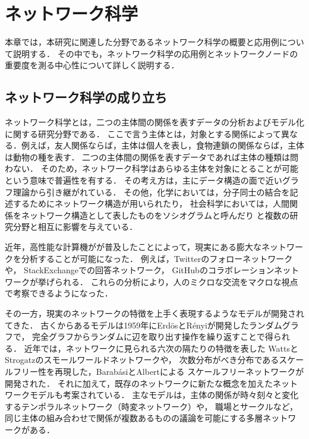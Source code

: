 \chapter{ネットワーク科学}
\label{chap:network-science}

本章では，本研究に関連した分野であるネットワーク科学の概要と応用例について説明する．
その中でも，ネットワーク科学の応用例とネットワークノードの重要度を測る中心性について詳しく説明する．

\section{ネットワーク科学の成り立ち}

ネットワーク科学とは，二つの主体間の関係を表すデータの分析およびモデル化に関する研究分野である．
ここで言う主体とは，対象とする関係によって異なる．例えば，友人関係ならば，主体は個人を表し，食物連鎖の関係ならば，主体は動物の種を表す．
二つの主体間の関係を表すデータであれば主体の種類は問わない．
そのため，ネットワーク科学はあらゆる主体を対象にとることが可能という意味で普遍性を有する．
その考え方は，主にデータ構造の面で近いグラフ理論から引き継がれている．
その他，化学においては，分子同士の結合を記述するためにネットワーク構造が用いられたり\cite{Sylvester1878}，
社会科学においては，人間関係をネットワーク構造として表したものをソシオグラムと呼んだり\cite{Moreno1978}
と複数の研究分野と相互に影響を与えている．

近年，高性能な計算機がが普及したことによって，現実にある膨大なネットワークを分析することが可能になった．
例えば，Twitterのフォローネットワーク\cite{Kwak2010}や，
StackExchangeでの回答ネットワーク\cite{Movshovitz-Attias2013}，
GitHubのコラボレーションネットワーク\cite{Lima2014}が挙げられる．
これらの分析により，人のミクロな交流をマクロな視点で考察できるようになった．

その一方，現実のネットワークの特徴を上手く表現するようなモデルが開発されてきた．
古くからあるモデルは1959年にErd{\"{o}}sとR{\'{e}}nyiが開発したランダムグラフ\cite{Erdos1959}で，
完全グラフからランダムに辺を取り出す操作を繰り返すことで得られる．
近年では，ネットワークに見られる六次の隔たり\cite{Travers1969}の特徴を表した
WattsとStrogatzのスモールワールドネットワーク\cite{Watts1998}や，
次数分布がべき分布であるスケールフリー性を再現した，Barab{\'{a}}siとAlbertによる
スケールフリーネットワーク\cite{Barabasi1999}が開発された．
それに加えて，既存のネットワークに新たな概念を加えたネットワークモデルも考案されている．
主なモデルは，主体の関係が時々刻々と変化するテンポラルネットワーク（時変ネットワーク）\cite{Holme2012}や，
職場とサークルなど，同じ主体の組み合わせで関係が複数あるものの議論を可能にする多層ネットワーク\cite{Kivela2014}がある．

